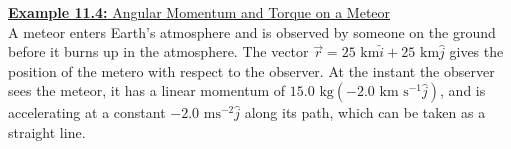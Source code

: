 \documentclass[a4paper]{article}
\let\bf\textbf
\newcommand\s{\text{ s}}
\newcommand\km{\text{ km}}
\newcommand\mss{\text{ ms}^{-2}}
\newcommand\kg{\text{ kg}}
\begin{document}
\newpage
\begin{shaded}
    \underline{\bf{Example 11.4:} Angular Momentum and Torque on a Meteor}
    \vspace{2mm}\\
    A meteor enters Earth's atmosphere and is observed by someone on the ground before it burns up in the atmosphere. The vector $\vec{r} = 25\km\hat{i} + 25\km\hat{j}$ gives the position of the metero with respect to the observer. At the instant the observer sees the meteor, it has a linear momentum of $15.0\kg(-2.0\km\s^{-1}\hat{j})$, and is accelerating at a constant $-2.0\mss\hat{j}$ along its path, which can be taken as a straight line.
    \begin{center}
\end{center}
\end{shaded}
\end{document}
